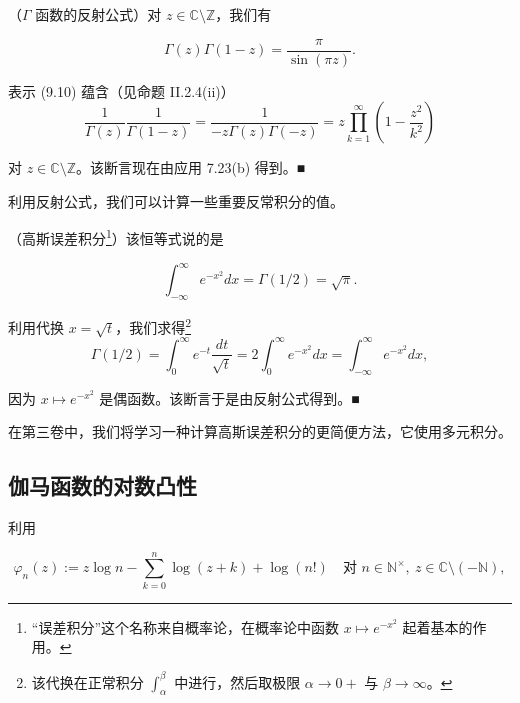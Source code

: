 \begin{theorem}

（$\Gamma$ 函数的反射公式）对 $ z \in \mathbb{C}\setminus\mathbb{Z} $，我们有

\[
\Gamma(z)\Gamma(1-z) = \frac{\pi}{\sin(\pi z)} .
\]

\proofhead
表示 (9.10) 蕴含（见命题 II.2.4(ii)）
\[
\frac{1}{\Gamma(z)} \frac{1}{\Gamma(1-z)} = \frac{1}{-z\Gamma(z)\Gamma(-z)} = z \prod_{k=1}^{\infty} \left( 1 - \frac{z^{2}}{k^{2}} \right)
\]

对 $ z \in \mathbb{C}\setminus\mathbb{Z} $。该断言现在由应用 7.23(b) 得到。\nobreak\hspace{0.35em}■

\end{theorem}

利用反射公式，我们可以计算一些重要反常积分的值。

\begin{application}

（高斯误差积分\footnote{“误差积分”这个名称来自概率论，在概率论中函数 $ x \mapsto e^{-x^{2}} $ 起着基本的作用。}）该恒等式说的是

\[
\int_{-\infty}^{\infty} e^{-x^{2}} dx = \Gamma(1/2) = \sqrt{\pi} .
\]

\proofhead
利用代换 $ x = \sqrt{t} $，我们求得\footnote{该代换在正常积分 $ \int_{\alpha}^{\beta} $ 中进行，然后取极限 $ \alpha \to 0+ $ 与 $ \beta \to \infty $。}
\[
\Gamma(1/2) = \int_{0}^{\infty} e^{-t} \frac{dt}{\sqrt{t}} = 2 \int_{0}^{\infty} e^{-x^{2}} dx = \int_{-\infty}^{\infty} e^{-x^{2}} dx ,
\]

因为 $ x \mapsto e^{-x^{2}} $ 是偶函数。该断言于是由反射公式得到。\nobreak\hspace{0.35em}■

\end{application}

在第三卷中，我们将学习一种计算高斯误差积分的更简便方法，它使用多元积分。

\subsection*{伽马函数的对数凸性}

利用

\[
\varphi_n(z) := z \log n - \sum_{k=0}^{n} \log(z+k) + \log(n!) \quad \text{对 } n \in \mathbb{N}^{\times} , \ z \in \mathbb{C}\setminus(-\mathbb{N}) ,
\]


